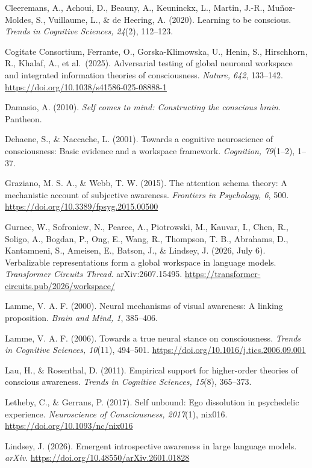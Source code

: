 \documentclass[
  11pt,
]{article}
\begin{document}
Cleeremans, A., Achoui, D., Beauny, A., Keuninckx, L., Martin, J.-R.,
Muñoz-Moldes, S., Vuillaume, L., \& de Heering, A. (2020). Learning to
be conscious. \emph{Trends in Cognitive Sciences, 24}(2), 112--123.

Cogitate Consortium, Ferrante, O., Gorska-Klimowska, U., Henin, S.,
Hirschhorn, R., Khalaf, A., et al.~(2025). Adversarial testing of global
neuronal workspace and integrated information theories of consciousness.
\emph{Nature, 642}, 133--142.
\url{https://doi.org/10.1038/s41586-025-08888-1}

Damasio, A. (2010). \emph{Self comes to mind: Constructing the conscious
brain}. Pantheon.

Dehaene, S., \& Naccache, L. (2001). Towards a cognitive neuroscience of
consciousness: Basic evidence and a workspace framework.
\emph{Cognition, 79}(1--2), 1--37.

Graziano, M. S. A., \& Webb, T. W. (2015). The attention schema theory:
A mechanistic account of subjective awareness. \emph{Frontiers in
Psychology, 6}, 500. \url{https://doi.org/10.3389/fpsyg.2015.00500}

Gurnee, W., Sofroniew, N., Pearce, A., Piotrowski, M., Kauvar, I., Chen,
R., Soligo, A., Bogdan, P., Ong, E., Wang, R., Thompson, T. B.,
Abrahams, D., Kantamneni, S., Ameisen, E., Batson, J., \& Lindsey, J.
(2026, July 6). Verbalizable representations form a global workspace in
language models. \emph{Transformer Circuits Thread}. arXiv:2607.15495.
\url{https://transformer-circuits.pub/2026/workspace/}

Lamme, V. A. F. (2000). Neural mechanisms of visual awareness: A linking
proposition. \emph{Brain and Mind, 1}, 385--406.

Lamme, V. A. F. (2006). Towards a true neural stance on consciousness.
\emph{Trends in Cognitive Sciences, 10}(11), 494--501.
\url{https://doi.org/10.1016/j.tics.2006.09.001}

Lau, H., \& Rosenthal, D. (2011). Empirical support for higher-order
theories of conscious awareness. \emph{Trends in Cognitive Sciences,
15}(8), 365--373.

Letheby, C., \& Gerrans, P. (2017). Self unbound: Ego dissolution in
psychedelic experience. \emph{Neuroscience of Consciousness, 2017}(1),
nix016. \url{https://doi.org/10.1093/nc/nix016}

Lindsey, J. (2026). Emergent introspective awareness in large language
models. \emph{arXiv}. \url{https://doi.org/10.48550/arXiv.2601.01828}
\end{document}
